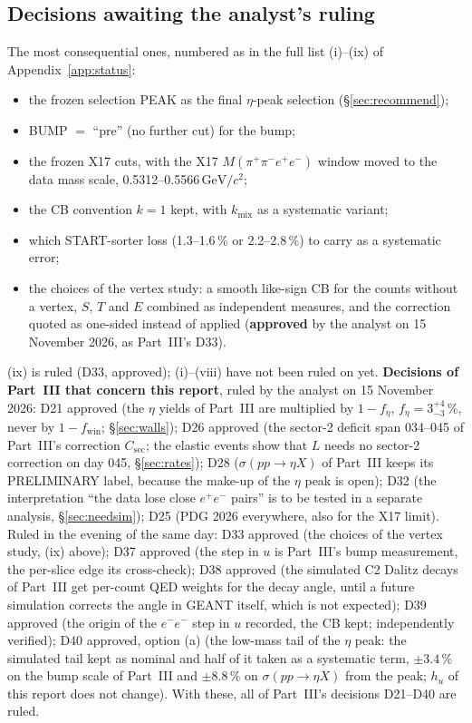 \documentclass[11pt,a4paper]{article}
\newcommand{\ee}{\ensuremath{e^{+}e^{-}}\xspace}
\newcommand{\Mfour}{\ensuremath{M(\pi^{+}\pi^{-}e^{+}e^{-})}\xspace}
\newcommand{\GeVcc}{\ensuremath{\mathrm{GeV}/c^{2}}\xspace}
\newcommand{\fwin}{\ensuremath{f_{\mathrm{win}}}\xspace}
\begin{document}
\subsection{Decisions awaiting the analyst's ruling}
\label{sec:decisions}
The most consequential ones, numbered as in the full list (i)--(ix) of Appendix~\ref{app:status}:
\begin{itemize}
\setlength{\itemsep}{0pt}
\item[(i)] the frozen selection PEAK as the final $\eta$-peak selection (\S\ref{sec:recommend});
\item[(ii)] BUMP $=$ ``pre'' (no further cut) for the bump;
\item[(iii)] the frozen X17 cuts, with the X17 \Mfour window moved to the data mass scale, 0.5312--0.5566\,\GeVcc;
\item[(v)] the CB convention $k=1$ kept, with $k_{\mathrm{mix}}$ as a systematic variant;
\item[(viii)] which START-sorter loss (1.3--1.6\,\% or 2.2--2.8\,\%) to carry as a systematic error;
\item[(ix)] the choices of the vertex study: a smooth like-sign CB for the counts without a vertex, $S$, $T$ and $E$ combined as
      independent measures, and the correction quoted as one-sided instead of applied (\textbf{approved} by the analyst on 15 November 2026,
      as Part~III's D33).
\end{itemize}
(ix) is ruled (D33, approved); (i)--(viii) have not been ruled on yet. \textbf{Decisions of Part~III that concern this report}, ruled by
the analyst on 15 November 2026:
D21 approved (the $\eta$ yields of Part~III are multiplied by $1-f_\eta$, $f_\eta=3^{+4}_{-3}$\,\%, never by $1-\fwin$; \S\ref{sec:walls});
D26 approved (the sector-2 deficit span 034--045 of Part~III's correction $C_{\mathrm{sec}}$; the elastic events show that $L$ needs no
sector-2 correction on day 045, \S\ref{sec:rates}); D28 ($\sigma(pp\to\eta X)$ of Part~III keeps its PRELIMINARY label, because the make-up of
the $\eta$ peak is open); D32 (the interpretation ``the data lose close \ee pairs'' is to be tested in a separate analysis,
\S\ref{sec:needsim}); D25 (PDG 2026 everywhere, also for the X17 limit). Ruled in the evening of the same day: D33 approved (the choices
of the vertex study, (ix) above); D37 approved (the step in $u$ is Part~III's bump measurement, the per-slice edge its cross-check); D38
approved (the simulated C2 Dalitz decays of Part~III get per-count QED weights for the decay angle, until a future simulation corrects the
angle in GEANT itself, which is not expected); D39 approved (the origin of the $e^-e^-$ step in $u$ recorded, the CB kept; independently
verified); D40 approved, option (a) (the low-mass tail of the $\eta$ peak: the simulated tail kept as nominal and half of it taken as a
systematic term, $\pm3.4$\,\% on the bump scale of Part~III and $\pm8.8$\,\% on $\sigma(pp\to\eta X)$ from the peak; $h_u$ of this report does
not change). With these, all of Part~III's decisions D21--D40 are ruled.
\end{document}
